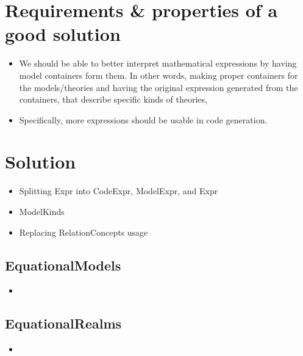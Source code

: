 \section{Requirements \& properties of a good solution}

\begin{itemize}

	\item We should be able to better interpret mathematical expressions
	      by having model containers form them. In other words, making
	      proper containers for the models/theories and having the original
          expression generated from the containers, that describe specific
          kinds of theories, 

	\item Specifically, more expressions should be usable in code generation.
	
\end{itemize}

\section{Solution}

\begin{itemize}

	\item Splitting Expr into CodeExpr, ModelExpr, and Expr
	
    \item ModelKinds
	
    \item Replacing RelationConcepts usage 

\end{itemize}

\subsection{EquationalModels}

\begin{itemize}

    \item {}

\end{itemize}

\subsection{EquationalRealms}

\begin{itemize}

    \item {}

\end{itemize}

